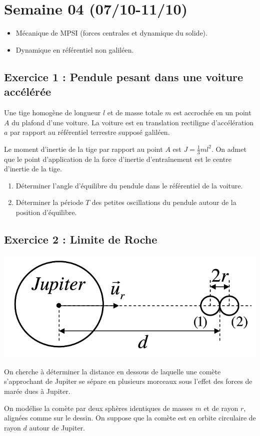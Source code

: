 \section{Semaine 04 (07/10-11/10) }

\begin{itemize}
	\item Mécanique de MPSI (forces centrales et dynamique du solide).
	\item Dynamique en référentiel non galiléen.
\end{itemize}

\subsection{Exercice 1 : Pendule pesant dans une voiture accélérée}

Une tige homogène de longueur $l$ et de masse totale $m$ est accrochée en un point $A$ du plafond d'une voiture. La voiture est en translation rectiligne d'accélération $a$ par rapport au référentiel terrestre supposé galiléen. 

Le moment d'inertie de la tige par rapport au point $A$ est $J = \frac{1}{3}m l ^2$. On admet que le point d'application de la force d'inertie d'entraînement est le centre d'inertie de la tige.

\begin{enumerate}
	\item Déterminer l'angle d'équilibre du pendule dans le référentiel de la voiture.
	\item Déterminer la période $T$ des petites oscillations du pendule autour de la position d'équilibre.
\end{enumerate}

\subsection{Exercice 2 : Limite de Roche}

\begin{minipage}[c]{\linewidth/2}
	\includegraphics[width=\linewidth]{Images/mp_s04_ex02.png}
\end{minipage}%
\begin{minipage}[c]{\linewidth/2}
	On cherche à déterminer la distance en dessous de laquelle une comète s'approchant de Jupiter se sépare en plusieurs morceaux sous l'effet des forces de marée dues à Jupiter.
	
	On modélise la comète par deux sphères identiques de masses $m$ et de rayon $r$, alignées comme sur le dessin. On suppose que la comète est en orbite circulaire de rayon $d$ autour de Jupiter.
\end{minipage} 

